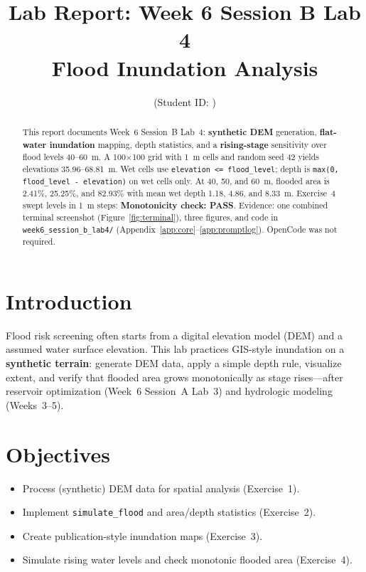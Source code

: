 \documentclass[11pt,a4paper]{article}
\title{Lab Report: Week 6 Session B Lab 4\\Flood Inundation Analysis}
\author{\studentname \quad (Student ID: \studentid)}
\date{\reportdate}
\begin{document}
\maketitle

\begin{abstract}
This report documents Week~6 Session~B Lab~4: \textbf{synthetic DEM} generation, \textbf{flat-water inundation} mapping, depth statistics, and a \textbf{rising-stage} sensitivity over flood levels 40--60~m. A 100$\times$100 grid with 1~m cells and random seed 42 yields elevations 35.96--68.81~m. Wet cells use \texttt{elevation <= flood\_level}; depth is \texttt{max(0, flood\_level - elevation)} on wet cells only. At 40, 50, and 60~m, flooded area is 2.41\%, 25.25\%, and 82.93\% with mean wet depth 1.18, 4.86, and 8.33~m. Exercise~4 swept levels in 1~m steps: \textbf{Monotonicity check: PASS}. Evidence: one combined terminal screenshot (Figure~\ref{fig:terminal}), three figures, and code in \texttt{week6\_session\_b\_lab4/} (Appendix~\ref{app:core}--\ref{app:promptlog}). OpenCode was not required.
\end{abstract}

\section{Introduction}
Flood risk screening often starts from a digital elevation model (DEM) and a assumed water surface elevation. This lab practices GIS-style inundation on a \textbf{synthetic terrain}: generate DEM data, apply a simple depth rule, visualize extent, and verify that flooded area grows monotonically as stage rises---after reservoir optimization (Week~6 Session~A Lab~3) and hydrologic modeling (Weeks~3--5).

\section{Objectives}
\begin{itemize}[noitemsep]
  \item Process (synthetic) DEM data for spatial analysis (Exercise~1).
  \item Implement \texttt{simulate\_flood} and area/depth statistics (Exercise~2).
  \item Create publication-style inundation maps (Exercise~3).
  \item Simulate rising water levels and check monotonic flooded area (Exercise~4).
\end{itemize}
\end{document}

